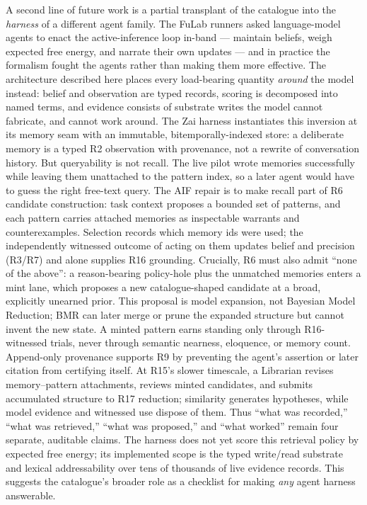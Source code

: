 A second line of future work is a partial transplant of the catalogue into the \emph{harness} of a different agent family.  The FuLab runners \cite{corneli2026patternsnewgenerationai} asked language-model agents to enact the active-inference loop in-band --- maintain beliefs, weigh expected free energy, and narrate their own updates --- and in practice the formalism fought the agents rather than making them more effective.  The architecture described here places every load-bearing quantity \emph{around} the model instead: belief and observation are typed records, scoring is decomposed into named terms, and evidence consists of substrate writes the model cannot fabricate, and cannot work around.  The Zai harness instantiates this inversion at its memory seam with an immutable, bitemporally-indexed store: a deliberate memory is a typed R2 observation with provenance, not a rewrite of conversation history.  But queryability is not recall.  The live pilot wrote memories successfully while leaving them unattached to the pattern index, so a later agent would have to guess the right free-text query.  The AIF repair is to make recall part of R6 candidate construction: task context proposes a bounded set of patterns, and each pattern carries attached memories as inspectable warrants and counterexamples.  Selection records which memory ids were used; the independently witnessed outcome of acting on them updates belief and precision (R3/R7) and alone supplies R16 grounding.  Crucially, R6 must also admit ``none of the above'': a reason-bearing policy-hole plus the unmatched memories enters a mint lane, which proposes a new catalogue-shaped candidate at a broad, explicitly unearned prior.  This proposal is model expansion, not Bayesian Model Reduction; BMR can later merge or prune the expanded structure but cannot invent the new state.  A minted pattern earns standing only through R16-witnessed trials, never through semantic nearness, eloquence, or memory count.  Append-only provenance supports R9 by preventing the agent's assertion or later citation from certifying itself.  At R15's slower timescale, a Librarian revises memory--pattern attachments, reviews minted candidates, and submits accumulated structure to R17 reduction; similarity generates hypotheses, while model evidence and witnessed use dispose of them.  Thus ``what was recorded,'' ``what was retrieved,'' ``what was proposed,'' and ``what worked'' remain four separate, auditable claims.  The harness does not yet score this retrieval policy by expected free energy; its implemented scope is the typed write/read substrate and lexical addressability over tens of thousands of live evidence records. This suggests the catalogue's broader role as a checklist for making \emph{any} agent harness answerable.

